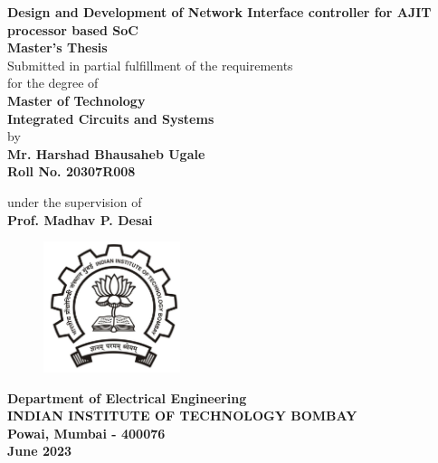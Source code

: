 \documentclass[12pt]{report}
\author{Harshad}
\begin{document}
\renewcommand{\arraystretch}{1.5}
\begin{center}
\Large
\textbf{Design and Development of Network Interface controller for AJIT processor based SoC}\\
\bigskip
\bigskip
\bigskip
\large
\textbf{Master's Thesis}\\
\bigskip
\normalsize
\vspace*{0.5cm}
Submitted in partial fulfillment of the requirements
\\for the degree of\\
\vspace*{.8cm} \textbf{Master of Technology}\\
\textbf{Integrated Circuits and Systems}\\
\vspace*{0.5cm}
by\\
\vspace*{0.5cm}
\textbf{\large Mr. Harshad Bhausaheb Ugale} \\
\textbf{Roll No. 20307R008}\\


\vspace*{0.5cm}

under the supervision of\\
\textbf{Prof. Madhav P. Desai}\\
\vspace*{1cm}


\vspace*{0.5cm}
\begin{figure}[h!]
 \centering
 \includegraphics[width=4cm]{iitb_logo.jpg}
\end{figure}
\bigskip
\textbf{Department of Electrical Engineering}\\
\bigskip
\textbf{INDIAN INSTITUTE OF TECHNOLOGY BOMBAY}\\
\textbf{Powai, Mumbai - 400076}\\
\textbf{June 2023}\\
\end{center}
\thispagestyle{empty}
\end{document}
